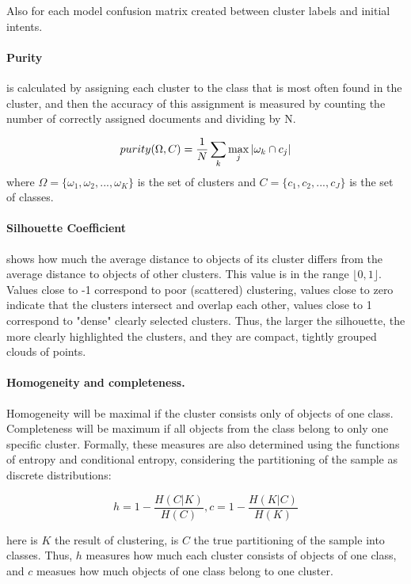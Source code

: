 \documentclass[11pt]{article}
\begin{document}
Also for each model confusion matrix created between cluster labels and initial intents.

\paragraph{Purity} is calculated by assigning each cluster to the class that is most often found in the cluster, and then the accuracy of this assignment is measured by counting the number of correctly assigned documents and dividing by N.

\begin{equation}
\centering
purity(\Omega,C) =\frac{1}{N} \sum_{k} \max_{j}|\omega_{k}\cap c_{j}|
\end{equation}
where $\Omega=\{\omega_{1}, \omega_{2}, ... ,\omega_{K}\}$ is the set of clusters and $C = \{c_{1}, c_{2}, ... , c_{J}\}$ is the set of classes. 

\paragraph{Silhouette Coefficient} shows how much the average distance to objects of its cluster differs from the average distance to objects of other clusters. This value is in the range $\lfloor 0, 1\rfloor$. Values close to -1 correspond to poor (scattered) clustering, values close to zero indicate that the clusters intersect and overlap each other, values close to 1 correspond to "dense" clearly selected clusters. Thus, the larger the silhouette, the more clearly highlighted the clusters, and they are compact, tightly grouped clouds of points.

\paragraph{Homogeneity and completeness.} Homogeneity will be maximal if the cluster consists only of objects of one class. Completeness will be maximum if all objects from the class belong to only one specific cluster.
Formally, these measures are also determined using the functions of entropy and conditional entropy, considering the partitioning of the sample as discrete distributions:

\begin{equation}
h = 1 - \frac{H(C|K)}{H(C)}, c = 1 - \frac{H(K|C)}{H(K)}
\end{equation}

here is $K$ the result of clustering, is $C$ the true partitioning of the sample into classes. Thus, $h$ measures how much each cluster consists of objects of one class, and $c$ measues how much objects of one class belong to one cluster.
\end{document}
